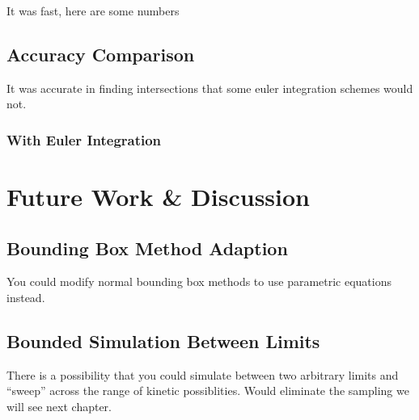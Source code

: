 	It was fast, here are some numbers

	\subsection{Accuracy Comparison}

	It was accurate in finding intersections that some euler integration schemes would not.

		\subsubsection{With Euler Integration}

\section{Future Work \& Discussion}

	\subsection{Bounding Box Method Adaption}

	You could modify normal bounding box methods to use parametric equations instead.

	\subsection{Bounded Simulation Between Limits}

	There is a possibility that you could simulate between two arbitrary limits and ``sweep'' across the range of kinetic possiblities. Would eliminate the sampling we will see next chapter.
